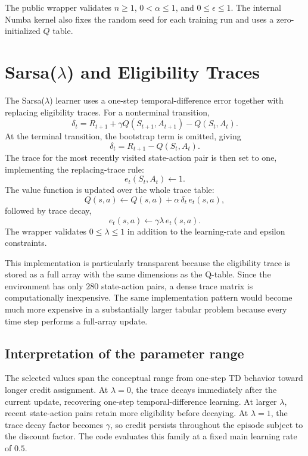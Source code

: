 \documentclass[11pt,a4paper]{article}
\begin{document}
The public wrapper validates $n\ge1$, $0<\alpha\le1$, and $0\le\epsilon\le1$. The internal Numba kernel also fixes the random seed for each training run and uses a zero-initialized $Q$ table.

\section{Sarsa($\lambda$) and Eligibility Traces}
The Sarsa($\lambda$) learner uses a one-step temporal-difference error together with replacing eligibility traces. For a nonterminal transition,
\begin{equation}
\delta_t
=
R_{t+1}+
\gamma Q(S_{t+1},A_{t+1})-
Q(S_t,A_t).
\label{eq:td}
\end{equation}
At the terminal transition, the bootstrap term is omitted, giving
\begin{equation}
\delta_t
=R_{t+1}-Q(S_t,A_t).
\label{eq:tdterminal}
\end{equation}
The trace for the most recently visited state-action pair is then set to one, implementing the replacing-trace rule:
\begin{equation}
e_t(S_t,A_t)\leftarrow1.
\label{eq:replace}
\end{equation}
The value function is updated over the whole trace table:
\begin{equation}
Q(s,a)\leftarrow Q(s,a)+\alpha\,\delta_t\,e_t(s,a),
\label{eq:qlambda}
\end{equation}
followed by trace decay,
\begin{equation}
e_t(s,a)\leftarrow\gamma\lambda\,e_t(s,a).
\label{eq:tracedecay}
\end{equation}
The wrapper validates $0\le\lambda\le1$ in addition to the learning-rate and epsilon constraints.

This implementation is particularly transparent because the eligibility trace is stored as a full array with the same dimensions as the Q-table. Since the environment has only $280$ state-action pairs, a dense trace matrix is computationally inexpensive. The same implementation pattern would become much more expensive in a substantially larger tabular problem because every time step performs a full-array update.

\subsection{Interpretation of the parameter range}
The selected values span the conceptual range from one-step TD behavior toward longer credit assignment. At $\lambda=0$, the trace decays immediately after the current update, recovering one-step temporal-difference learning. At larger $\lambda$, recent state-action pairs retain more eligibility before decaying. At $\lambda=1$, the trace decay factor becomes $\gamma$, so credit persists throughout the episode subject to the discount factor. The code evaluates this family at a fixed main learning rate of $0.5$.
\end{document}
